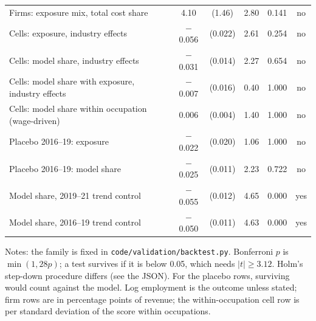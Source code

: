 \begin{table}[tbp]
\begin{tabular}{@{}lccccc@{}}
Firms: exposure mix, total cost share & 4.10 & (1.46) & 2.80 & 0.141 & no\\
Cells: exposure, industry effects & $-$0.056 & (0.022) & 2.61 & 0.254 & no\\
Cells: model share, industry effects & $-$0.031 & (0.014) & 2.27 & 0.654 & no\\
Cells: model share with exposure, industry effects & $-$0.007 & (0.016) & 0.40 & 1.000 & no\\
Cells: model share within occupation (wage-driven) & 0.006 & (0.004) & 1.40 & 1.000 & no\\
Placebo 2016--19: exposure & $-$0.022 & (0.020) & 1.06 & 1.000 & no\\
Placebo 2016--19: model share & $-$0.025 & (0.011) & 2.23 & 0.722 & no\\
Model share, 2019--21 trend control & $-$0.055 & (0.012) & 4.65 & 0.000 & yes\\
Model share, 2016--19 trend control & $-$0.050 & (0.011) & 4.63 & 0.000 & yes\\
\bottomrule
\end{tabular}
\smallskip
\begin{minipage}{0.97\linewidth}\footnotesize
Notes: the family is fixed in \texttt{code/\allowbreak validation/\allowbreak backtest.py}. Bonferroni $p$ is $\min(1, 28p)$; a test survives if it is below 0.05, which needs $|t|\ge3.12$. Holm's step-down procedure differs (see the JSON). For the placebo rows, surviving would count against the model. Log employment is the outcome unless stated; firm rows are in percentage points of revenue; the within-occupation cell row is per standard deviation of the score within occupations.
\end{minipage}
\end{table}
